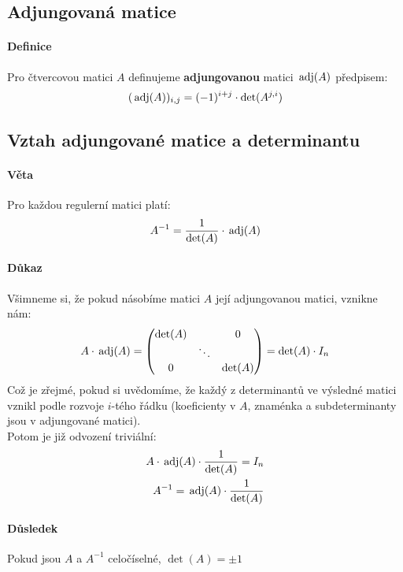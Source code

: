 \documentclass[a4paper,10pt]{article}
\begin{document}
\subsection{Adjungovaná matice}
\setcounter{equation}{0}
\paragraph{Definice}
Pro čtvercovou matici $A$ definujeme \textbf{adjungovanou} matici $\operatorname*{\,adj}(A)$
předpisem:
\begin{align*}
	(\operatorname*{\,adj}(A))_{i,j} = (-1)^{i+j} \cdot \det (A^{j,i})
\end{align*}

\subsection{Vztah adjungované matice a determinantu}
\setcounter{equation}{0}
\paragraph{Věta}
Pro každou regulerní matici platí:
\begin{align*}
	A^{-1} = \frac{1}{\det(A)} \cdot \operatorname*{\,adj} (A)
\end{align*}
\paragraph{Důkaz}
Všimneme si, že pokud násobíme matici $A$ její adjungovanou matici, vznikne nám:
\begin{align}
	A \cdot \operatorname*{\,adj}(A) = \left( \begin{matrix}
		\det(A) &  & 0 \\
		 & \ddots &  \\
		0 &  & \det(A) 
	\end{matrix}\right) = \det(A) \cdot I_n
\end{align}
Což je zřejmé, pokud si uvědomíme, že každý z determinantů ve výsledné matici
vznikl podle rozvoje $i$-tého řádku (koeficienty v $A$, znaménka a subdeterminanty
jsou v adjungované matici). \\
Potom je již odvození triviální:
\begin{align}
	A \cdot \operatorname*{\,adj}(A) \cdot \frac{1}{\det(A)} = I_n \\
	A^{-1} = \operatorname*{\,adj}(A) \cdot \frac{1}{\det(A)}
\end{align}

\paragraph{Důsledek}
Pokud jsou $A$ a $A^{-1}$ celočíselné, $\det(A) = \pm 1$
\end{document}
